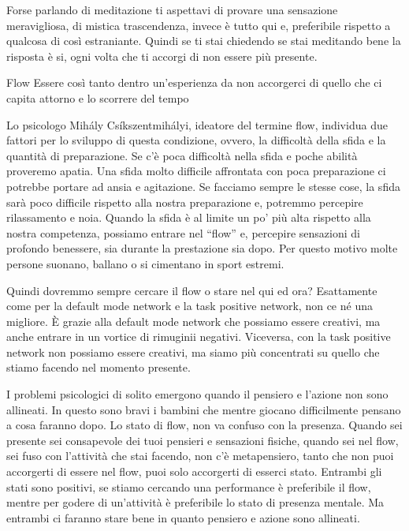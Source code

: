 \documentclass[12pt]{book} %
\begin{document}
Forse parlando di meditazione ti aspettavi di provare una sensazione meravigliosa, di mistica trascendenza, invece è
tutto qui e, preferibile rispetto a qualcosa di così estraniante. Quindi se ti stai chiedendo se stai meditando bene la
risposta è si, ogni volta che ti accorgi di non essere più presente.

\begin{mdframed}[linewidth=1pt]
Flow
Essere così tanto dentro un'esperienza da non accorgerci di quello che ci capita attorno e lo scorrere del tempo

Lo psicologo Mihály Csíkszentmihályi, ideatore del termine flow, individua due fattori per lo sviluppo di questa
condizione, ovvero, la difficoltà della sfida e la quantità di preparazione. Se c'è poca difficoltà nella sfida e poche abilità proveremo apatia. Una sfida molto difficile affrontata con poca preparazione ci
potrebbe portare ad ansia e agitazione. Se facciamo sempre le stesse cose, la sfida sarà poco difficile rispetto alla nostra
preparazione e, potremmo percepire rilassamento e noia. Quando la sfida è al limite un po'
più alta rispetto alla nostra competenza, possiamo entrare nel “flow” e, percepire sensazioni di profondo benessere,
sia durante la prestazione sia dopo. Per questo motivo molte persone suonano, ballano o si cimentano in sport estremi.

Quindi dovremmo sempre cercare il flow o stare nel qui ed ora? 
Esattamente come per la default mode network e la task positive network, non ce né una migliore. È grazie alla default mode network che possiamo essere creativi, ma anche entrare in un vortice di rimuginii negativi. Viceversa, con la task positive network non possiamo essere creativi, ma siamo più concentrati su
quello che stiamo facendo nel momento presente.

I problemi psicologici di solito emergono quando il pensiero e l'azione non sono allineati. In questo sono bravi i bambini che mentre giocano difficilmente pensano a cosa faranno dopo. Lo stato di flow, non va confuso con la presenza. Quando sei presente sei consapevole dei tuoi pensieri e sensazioni fisiche, quando sei nel flow, sei fuso con l'attività che stai facendo, non c'è metapensiero, tanto che non puoi accorgerti di essere nel flow, puoi solo accorgerti di esserci stato. Entrambi gli stati sono positivi, se stiamo cercando una performance è preferibile il flow, mentre per godere di un'attività è preferibile lo stato di presenza mentale. Ma entrambi ci faranno stare bene in quanto pensiero e azione sono allineati.
\end{mdframed}
\end{document}
